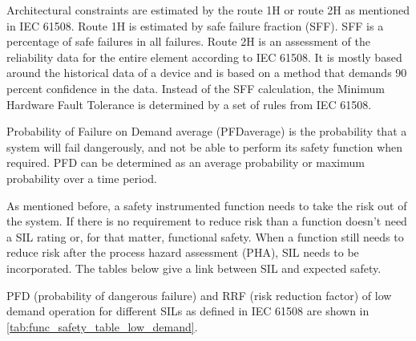 Architectural constraints are estimated by the route 1H or route 2H as mentioned in IEC 61508. Route 1H is estimated by safe failure fraction (SFF). SFF is a percentage of safe failures in all failures. Route 2H is an assessment of the reliability data for the entire element according to IEC 61508. It is mostly based around the historical data of a device and is based on a method that demands 90 percent confidence in the data.  Instead of the SFF calculation, the Minimum Hardware Fault Tolerance is determined by a set of rules from IEC 61508.

Probability of Failure on Demand average (PFDaverage) is the probability that a system will fail dangerously, and not be able to perform its safety function when required. PFD can be determined as an average probability or maximum probability over a time period.

As mentioned before, a safety instrumented function needs to take the risk out of the system. If there is no requirement to reduce risk than a function doesn't need a SIL rating or, for that matter, functional safety. When a function still needs to reduce risk after the process hazard assessment (PHA), SIL needs to be incorporated. The tables below give a link between SIL and expected safety.

PFD (probability of dangerous failure) and RRF (risk reduction factor) of low demand operation for different SILs as defined in IEC 61508 are shown in \autoref{tab:func_safety_table_low_demand}.

\begin{table}[H]
\centering
\caption{Link between SIL, PFH and RRF for low demand operation}
\label{tab:func_safety_table_low_demand}
\end{table}

